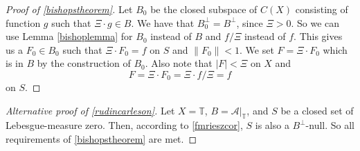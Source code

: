\documentclass[a4paper,12pt,twoside,BCOR=10mm]{scrbook}
\theoremstyle{definition}
\theoremstyle{definition}
\theoremstyle{definition}
\begin{document}
\begin{proof}[Proof of \ref{bishopstheorem}]
Let $B_0$ be the closed subspace of $C(X)$ consisting of function $g$ such that $\Xi \cdot g \in B$.
We have that $B_0^{\bot} = B^{\bot}$, since $\Xi > 0$.
So we can use Lemma \ref{bishoplemma} for $B_0$ instead of $B$ and $f/\Xi$ instead of $f$.
This gives us a $F_0 \in B_0$ such that $\Xi \cdot F_0 = f$ on $S$ and $\|F_0\| < 1$.
We set $F = \Xi \cdot F_0$ which is in $B$ by the construction of $B_0$.
Also note that $|F| < \Xi$ on $X$ and 
\[
	F = \Xi \cdot F_0 = \Xi \cdot f/\Xi = f
\]
on $S$.
\end{proof}
\begin{proof}[Alternative proof of \ref{rudincarleson}]
Let
	$X = \mathbb{T}$,
	$B = \mathcal{A}|_{\mathbb{T}}$,
	and $S$ be a closed set of Lebesgue-measure zero. 
Then, according to \ref{fmrieszcor}, $S$ is also a $B^{\bot}$-null.
So all requirements of \ref{bishopstheorem} are met.
\end{proof}

\appendix
\renewcommand{\chaptername}{Appendix}
\end{document}
